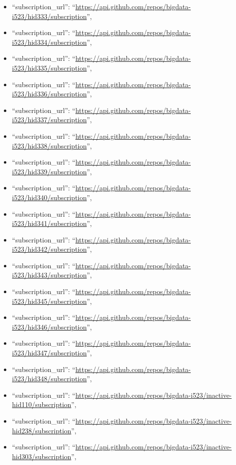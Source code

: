\begin{itemize}
\item
  ``subscription\_url'':
  ``\url{https://api.github.com/repos/bigdata-i523/hid333/subscription}'',
\item
  ``subscription\_url'':
  ``\url{https://api.github.com/repos/bigdata-i523/hid334/subscription}'',
\item
  ``subscription\_url'':
  ``\url{https://api.github.com/repos/bigdata-i523/hid335/subscription}'',
\item
  ``subscription\_url'':
  ``\url{https://api.github.com/repos/bigdata-i523/hid336/subscription}'',
\item
  ``subscription\_url'':
  ``\url{https://api.github.com/repos/bigdata-i523/hid337/subscription}'',
\item
  ``subscription\_url'':
  ``\url{https://api.github.com/repos/bigdata-i523/hid338/subscription}'',
\item
  ``subscription\_url'':
  ``\url{https://api.github.com/repos/bigdata-i523/hid339/subscription}'',
\item
  ``subscription\_url'':
  ``\url{https://api.github.com/repos/bigdata-i523/hid340/subscription}'',
\item
  ``subscription\_url'':
  ``\url{https://api.github.com/repos/bigdata-i523/hid341/subscription}'',
\item
  ``subscription\_url'':
  ``\url{https://api.github.com/repos/bigdata-i523/hid342/subscription}'',
\item
  ``subscription\_url'':
  ``\url{https://api.github.com/repos/bigdata-i523/hid343/subscription}'',
\item
  ``subscription\_url'':
  ``\url{https://api.github.com/repos/bigdata-i523/hid345/subscription}'',
\item
  ``subscription\_url'':
  ``\url{https://api.github.com/repos/bigdata-i523/hid346/subscription}'',
\item
  ``subscription\_url'':
  ``\url{https://api.github.com/repos/bigdata-i523/hid347/subscription}'',
\item
  ``subscription\_url'':
  ``\url{https://api.github.com/repos/bigdata-i523/hid348/subscription}'',
\item
  ``subscription\_url'':
  ``\url{https://api.github.com/repos/bigdata-i523/inactive-hid110/subscription}'',
\item
  ``subscription\_url'':
  ``\url{https://api.github.com/repos/bigdata-i523/inactive-hid238/subscription}'',
\item
  ``subscription\_url'':
  ``\url{https://api.github.com/repos/bigdata-i523/inactive-hid303/subscription}'',

\end{itemize}
